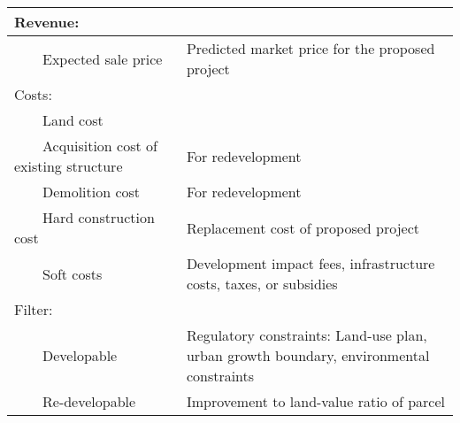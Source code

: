

\begin{tabular}{l p{3.26506in}}
\hline
Revenue:
&
\\\hline
\ \ \ \ Expected sale price
&
Predicted market price for the proposed project
\bigskip
\\

Costs:
&
\\\hline
\ \ \ \ Land cost
&
\\
\ \ \ \ Acquisition cost of existing structure
&
For redevelopment
\\
\ \ \ \ Demolition cost
&
For redevelopment
\\
\ \ \ \ Hard construction cost
&
Replacement cost of proposed project
\\
\ \ \ \ Soft costs
&
Development impact fees, infrastructure costs, taxes, or subsidies
\bigskip
\\

Filter:
&
\\\hline
\ \ \ \ Developable
&
Regulatory constraints: Land{}-use plan, urban growth boundary,
environmental constraints
\\
\ \ \ \ Re{}-developable
&
Improvement to land{}-value ratio of parcel
\\\hline
\end{tabular}

